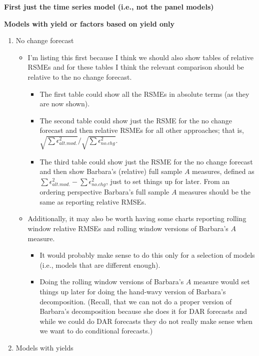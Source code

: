 \documentclass[11pt]{article}
\begin{document}
\noindent

\textbf{First just the time series model (i.e., not the panel models)}

\textbf{Models with yield or factors based on yield only}

\begin{enumerate}
\item No change forecast 
\begin{itemize}
\item I'm listing this first because I think we should also show tables of relative RSMEs and for these tables I think the relevant comparison should be relative to the no change forecast.    
\begin{itemize}
\item The first table could show all the RSMEs in absolute terms (as they are now shown).  
\item The second table could show just the RSME for the no change forecast and then relative RSMEs for all other approaches; that is, $\sqrt{\sum \epsilon^{2}_{alt.mod.}}/\sqrt{\sum \epsilon^{2}_{no.chg}}$.
\item The third table could show just the RSME for the no change forecast and then show Barbara's (relative) full sample $A$ measures, defined as $\sum \epsilon^{2}_{alt.mod.}-\sum \epsilon^{2}_{no.chg}$, just to set things up for later. From an ordering perspective Barbara's full sample $A$ measures should be the same as reporting relative RMSEs.
\end{itemize}
\item Additionally, it may also be worth having some charts reporting rolling window relative RMSEs and rolling window versions of Barbara's $A$ measure.  
\begin{itemize}
\item It would probably make sense to do this only for a selection of models (i.e., models that are different enough).  
\item Doing the rolling window versions of Barbara's $A$ measure would set things up later for doing the hand-wavy version of Barbara's decomposition. (Recall, that we can not do a proper version of Barbara's decomposition because she does it for DAR forecasts and while we could do DAR forecasts they do not really make sense when we want to do conditional forecasts.)  
\end{itemize}
\end{itemize}
\item Models with yields
\begin{enumerate}

\end{enumerate}
\end{enumerate}
\end{document}

